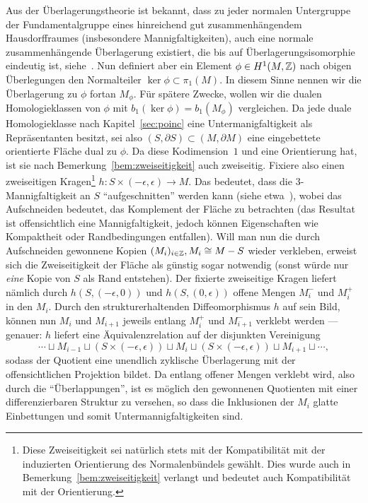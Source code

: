 \begin{constr}
	\label{constr:cut}
	Aus der Überlagerungstheorie ist bekannt, dass zu jeder normalen Untergruppe der Fundamentalgruppe eines hinreichend gut zusammenhängendem Hausdorffraumes (insbesondere Mannigfaltigkeiten), auch eine normale zusammenhängende Überlagerung existiert, die bis auf Überlagerungsisomorphie eindeutig ist, siehe~\cite[Chapter~1.3]{Hatcher.2002}. Nun definiert aber ein Element $\phi\in H^1(M,\mathbb{Z})$ nach obigen Überlegungen den Normalteiler $\ker\phi\subset \pi_1(M)$. In diesem Sinne nennen wir die Überlagerung zu $\phi$ fortan $M_\phi$. Für spätere Zwecke, wollen wir die dualen Homologieklassen von $\phi$ mit $b_1(\ker\phi)=b_1(M_\phi)$ vergleichen. Da jede duale Homologieklasse nach Kapitel~\ref{sec:poinc} eine Untermanigfaltigkeit als Repräsentanten besitzt, sei also $(S,\partial S) \subset (M,\partial M)$ eine eingebettete orientierte Fläche dual zu $\phi$. Da diese Kodimension~$1$ und eine Orientierung hat, ist sie nach Bemerkung~\ref{bem:zweiseitigkeit} auch zweiseitig. Fixiere also einen zweiseitigen Kragen\footnote{Diese Zweiseitigkeit sei natürlich stets mit der Kompatibilität mit der induzierten Orientierung des Normalenbündels gewählt. Dies wurde auch in Bemerkung~\ref{bem:zweiseitigkeit} verlangt und bedeutet auch Kompatibilität mit der Orientierung.} $h:S\times (-\epsilon,\epsilon) \to M$. Das bedeutet, dass die 3-Mannigfaltigkeit an $S$ "`aufgeschnitten"' werden kann (siehe etwa~\cite[Kapitel~4.2]{Burde.2003}), wobei das Aufschneiden bedeutet, das Komplement der Fläche zu betrachten (das Resultat ist offensichtlich eine Mannigfaltigkeit, jedoch können Eigenschaften wie Kompaktheit oder Randbedingungen entfallen). Will man nun die durch Aufschneiden gewonnene Kopien $(M_i)_{i\in \mathbb{Z}}, M_i \cong M-S$ wieder verkleben, erweist sich die Zweiseitigkeit der Fläche als günstig sogar notwendig (sonst würde nur \emph{eine} Kopie von $S$ als Rand entstehen). Der fixierte zweiseitige Kragen liefert nämlich durch $h(S,(-\epsilon,0))$ und $h(S,(0,\epsilon))$ offene Mengen $M_i^-$ und $M_i^+$ in den $M_i$. Durch den strukturerhaltenden Diffeomorphismus $h$ auf sein Bild, können nun $M_i$ und $M_{i+1}$ jeweils entlang $M_i^+$ und $M_{i+1}^-$ verklebt werden --- genauer: $h$ liefert eine Äquivalenzrelation auf der disjunkten Vereinigung 
	\[
		\cdots \sqcup M_{i-1} \sqcup (S \times (-\epsilon,\epsilon)) \sqcup M_i \sqcup  (S \times (-\epsilon,\epsilon)) \sqcup M_{i+1} \sqcup \cdots,
	\]
	sodass der Quotient eine unendlich zyklische Überlagerung mit der offensichtlichen Projektion bildet. Da entlang offener Mengen verklebt wird, also durch die "`Überlappungen"', ist es möglich den gewonnenen Quotienten mit einer differenzierbaren Struktur zu versehen, so dass die Inklusionen der $M_i$ glatte Einbettungen und somit Untermannigfaltigkeiten sind.


\end{constr}
